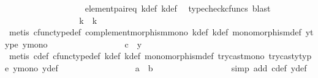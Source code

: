 \begin{isabellebody}
\ \ \ \ \ \ \ \ \ \ \ \ \ \ \ \ \isamarkupfalse%
\ \ element{\isacharunderscore}{\kern0pt}pair{\isacharunderscore}{\kern0pt}eq\ k{\isacharprime}{\kern0pt}{\isacharunderscore}{\kern0pt}def\ k{\isacharunderscore}{\kern0pt}def\ \isamarkupfalse%
\ {\isacharparenleft}{\kern0pt}typecheck{\isacharunderscore}{\kern0pt}cfuncs{\isacharcomma}{\kern0pt}\ blast{\isacharparenright}{\kern0pt}\isanewline
\ \ \ \ \ \ \ \ \ \ \ \ \ \ \isamarkupfalse%
\ \isamarkupfalse%
\ {\isachardoublequoteopen}k{\isacharprime}{\kern0pt}\ {\isacharequal}{\kern0pt}\ k{\isachardoublequoteclose}\isanewline
\ \ \ \ \ \ \ \ \ \ \ \ \ \ \ \ \isamarkupfalse%
\ {\isacharparenleft}{\kern0pt}metis\ cfunc{\isacharunderscore}{\kern0pt}type{\isacharunderscore}{\kern0pt}def\ complement{\isacharunderscore}{\kern0pt}morphism{\isacharunderscore}{\kern0pt}mono\ k{\isacharprime}{\kern0pt}{\isacharunderscore}{\kern0pt}def\ k{\isacharunderscore}{\kern0pt}def\ monomorphism{\isacharunderscore}{\kern0pt}def\ y{}{\isacharprime}{\kern0pt}{\isacharunderscore}{\kern0pt}type\ y{}{\isacharunderscore}{\kern0pt}mono{\isacharparenright}{\kern0pt}\isanewline
\ \ \ \ \ \ \ \ \ \ \ \ \ \ \isamarkupfalse%
\ \isamarkupfalse%
\ {\isachardoublequoteopen}c\ {\isacharequal}{\kern0pt}\ y{\isachardoublequoteclose}\isanewline
\ \ \ \ \ \ \ \ \ \ \ \ \ \ \ \ \isamarkupfalse%
\ {\isacharparenleft}{\kern0pt}metis\ c{\isacharunderscore}{\kern0pt}def\ cfunc{\isacharunderscore}{\kern0pt}type{\isacharunderscore}{\kern0pt}def\ k{\isacharprime}{\kern0pt}{\isacharunderscore}{\kern0pt}def\ k{\isacharunderscore}{\kern0pt}def\ monomorphism{\isacharunderscore}{\kern0pt}def\ try{\isacharunderscore}{\kern0pt}cast{\isacharunderscore}{\kern0pt}mono\ trycast{\isacharunderscore}{\kern0pt}y{}{\isacharunderscore}{\kern0pt}type\ y{}{\isacharunderscore}{\kern0pt}mono\ y{\isacharunderscore}{\kern0pt}def{\isacharparenright}{\kern0pt}\isanewline
\ \ \ \ \ \ \ \ \ \ \ \ \ \ \isamarkupfalse%
\ \isamarkupfalse%
\ {\isachardoublequoteopen}a\ {\isacharequal}{\kern0pt}\ b{\isachardoublequoteclose}\isanewline
\ \ \ \ \ \ \ \ \ \ \ \ \ \ \ \ \isamarkupfalse%
\ {\isacharparenleft}{\kern0pt}simp\ add{\isacharcolon}{\kern0pt}\ c{\isacharunderscore}{\kern0pt}def\ y{\isacharunderscore}{\kern0pt}def{\isacharparenright}{\kern0pt}\isanewline
\ \ \ \ \ \ \ \ \ \ \isamarkupfalse%
\isanewline
\ \ \ \ \ \ \ \ \isamarkupfalse%

\end{isabellebody}
